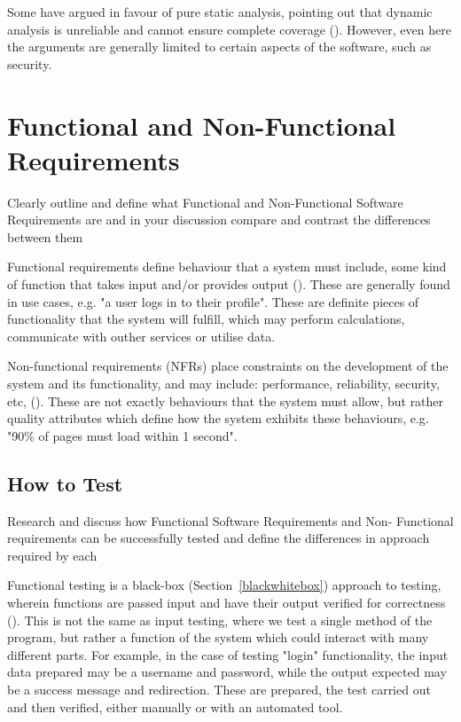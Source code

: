 \documentclass[12pt]{article}
\begin{document}
Some have argued in favour of pure static analysis, pointing out that dynamic analysis is unreliable and cannot ensure complete coverage (). However, even here the arguments are generally limited to certain aspects of the software, such as security. 



\section{Functional and Non-Functional Requirements} \label{reqs}
Clearly outline and define what Functional and Non-Functional Software Requirements are and in your discussion compare and contrast the differences between them

Functional requirements define behaviour that a system must include, some kind of function that takes input and/or provides output (). These are generally found in use cases, e.g. "a user logs in to their profile". These are definite pieces of functionality that the system will fulfill, which may perform calculations, communicate with outher services or utilise data.

Non-functional requirements (NFRs) place constraints on the development of the system and its functionality, and may include: performance, reliability, security, etc, (). These are not exactly behaviours that the system must allow, but rather quality attributes which define how the system exhibits these behaviours, e.g. "90\% of pages must load within 1 second".



\subsection{How to Test}
Research and discuss how Functional Software Requirements and Non- Functional requirements can be successfully tested and define the differences in approach required by each

Functional testing is a black-box (Section~\ref{blackwhitebox}) approach to testing, wherein functions are passed input and have their output verified for correctness (). This is not the same as input testing, where we test a single method of the program, but rather a function of the system which could interact with many different parts. For example, in the case of testing "login" functionality, the input data prepared may be a username and password, while the output expected may be a success message and redirection. These are prepared, the test carried out and then verified, either manually or with an automated tool.
\end{document}
